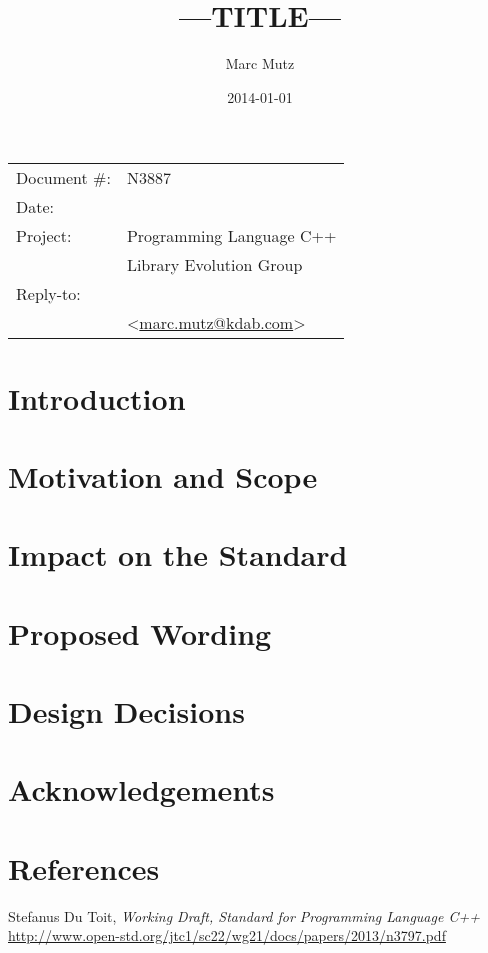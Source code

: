 \documentclass[11pt]{article}
\date{}
\title{---TITLE---}
\makeatletter
\newcommand{\emailaddress}{marc.mutz@kdab.com}
\newcommand{\email}{\href{mailto:\emailaddress}{\emailaddress}}
\makeatother
\begin{document}
\maketitle\vspace{-2cm}

\begin{flushright}
  \begin{tabular}{ll}
  Document \#:&N3887\\
  Date:       &\date{2014-01-01}\\
  Project:    &Programming Language C++\\
              &Library Evolution Group\\
  Reply-to:   &\author{Marc Mutz}\\
              &\textless\email\textgreater
  \end{tabular}
\end{flushright}

\section{Introduction}

\section{Motivation and Scope}

\section{Impact on the Standard}

\section{Proposed Wording}

\section{Design Decisions}

\section{Acknowledgements}

\section{References}
\renewcommand{\section}[2]{}%
\begin{thebibliography}{9}

    Stefanus Du Toit,
    \emph{Working Draft, Standard for Programming Language C++}\newline
    \url{http://www.open-std.org/jtc1/sc22/wg21/docs/papers/2013/n3797.pdf}

\end{thebibliography}
\end{document}
